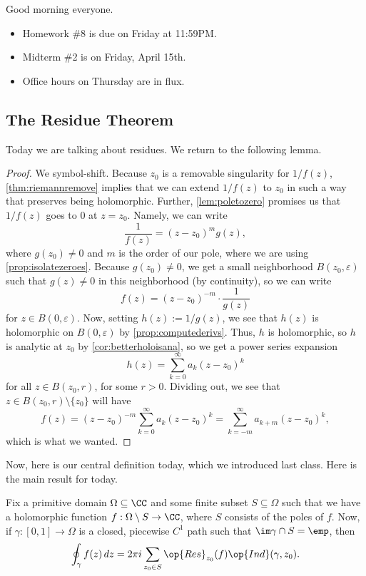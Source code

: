 
Good morning everyone.
\begin{itemize}
	\item Homework \#8 is due on Friday at 11:59PM.
	\item Midterm \#2 is on Friday, April 15th.
	\item Office hours on Thursday are in flux.
\end{itemize}

\subsection{The Residue Theorem}
Today we are talking about residues. We return to the following lemma.
\laurent*
\begin{proof}
	We symbol-shift. Because $z_0$ is a removable singularity for $1/f(z)$, \autoref{thm:riemannremove} implies that we can extend $1/f(z)$ to $z_0$ in such a way that preserves being holomorphic. Further, \autoref{lem:poletozero} promises us that $1/f(z)$ goes to $0$ at $z=z_0$. Namely, we can write
	\[\frac1{f(z)}=(z-z_0)^mg(z),\]
	where $g(z_0)\ne0$ and $m$ is the order of our pole, where we are using \autoref{prop:isolatezeroes}. Because $g(z_0)\ne0$, we get a small neighborhood $B(z_0,\varepsilon)$ such that $g(z)\ne0$ in this neighborhood (by continuity), so we can write
	\[f(z)=(z-z_0)^{-m}\cdot\frac1{g(z)}\]
	for $z\in B(0,\varepsilon)$. Now, setting $h(z):=1/g(z)$, we see that $h(z)$ is holomorphic on $B(0,\varepsilon)$ by \autoref{prop:computederivs}. Thus, $h$ is holomorphic, so $h$ is analytic at $z_0$ by \autoref{cor:betterholoisana}, so we get a power series expansion
	\[h(z)=\sum_{k=0}^\infty a_k(z-z_0)^k\]
	for all $z\in B(z_0,r)$, for some $r>0$. Dividing out, we see that $z\in B(z_0,r)\setminus\{z_0\}$ will have
	\[f(z)=(z-z_0)^{-m}\sum_{k=0}^\infty a_k(z-z_0)^k=\sum_{k=-m}^\infty a_{k+m}(z-z_0)^k,\]
	which is what we wanted.
\end{proof}
Now, here is our central definition today, which we introduced last class.
\resideudef*
\noindent Here is the main result for today.
\begin{theorem}[Residue] \label{thm:residue}
	Fix a primitive domain $\Omega\subseteq\CC$ and some finite subset $S\subseteq\Omega$ such that we have a holomorphic function $f:\Omega\setminus S\to\CC$, where $S$ consists of the poles of $f$. Now, if $\gamma:[0,1]\to\Omega$ is a closed, piecewise $C^1$ path such that $\im\gamma\cap S=\emp$, then
	\[\oint_\gamma f(z)\,dz=2\pi i\sum_{z_0\in S}\op{Res}_{z_0}(f)\op{Ind}(\gamma,z_0).\]
\end{theorem}

